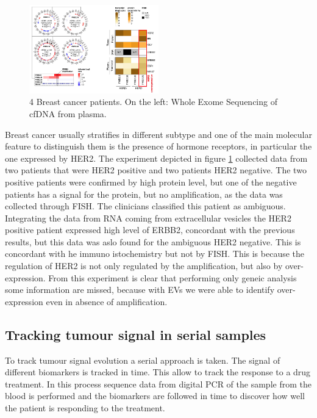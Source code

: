     \begin{figure}[H]
        \centering
        \includegraphics[width=0.5\textwidth]{cancer2.png}
        \caption{4 Breast cancer patients. On the left:  Whole Exome Sequencing of cfDNA from plasma.}
        \label{fig:cancer2}
    \end{figure}

    Breast cancer usually stratifies in different subtype and one of the main molecular feature to distinguish them is the presence of hormone receptors, in particular the one expressed by HER2.
    The experiment depicted in figure \ref{fig:cancer2} collected data from two patients that were HER2 positive and two patients HER2 negative.
    The two positive patients were confirmed by high protein level, but one of the negative patients has a signal for the protein, but no amplification, as the data was collected through FISH.
    The clinicians classified this patient as ambiguous.
    Integrating the data from RNA coming from extracellular vesicles the HER2 positive patient expressed high level of ERBB2, concordant with the previous results, but this data was aslo found for the ambiguous HER2 negative.
    This is concordant with he immuno istochemistry but not by FISH.
    This is because the regulation of HER2 is not only regulated by the amplification, but also by over-expression.
    From this experiment is clear that performing only geneic analysis some information are missed, because with EVs we were able to identify over-expression even in absence of amplification.

    \subsection{Tracking tumour signal in serial samples}
    To track tumour signal evolution a serial approach is taken.
    The signal of different biomarkers is tracked in time.
    This allow to track the response to a drug treatment.
    In this process sequence data from digital PCR of the sample from the blood is performed and the biomarkers are followed in time to discover how well the patient is responding to the treatment.

